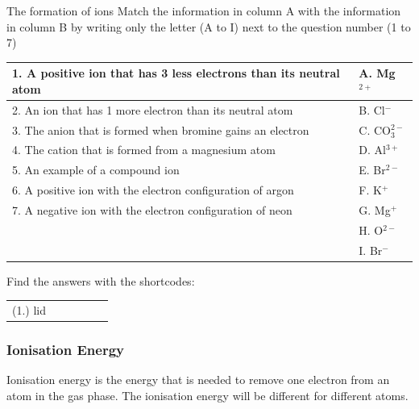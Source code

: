 \begin{exercises}{The formation of ions}
            \nopagebreak
            \label{m38757*id261135}Match the information in column A with the information in column B by writing only the letter (A to I) next to the question number (1 to 7)
\begin{center}
\begin{tabular}{|p{6cm}|p{2cm}|}\hline
1. A positive ion that has 3 less electrons than its neutral atom & A. Mg$^{2+}$ \\\hline
2. An ion that has 1 more electron than its neutral atom & B. Cl$^{-}$ \\\hline
3. The anion that is formed when bromine gains an electron & C. CO$_{3}^{2-}$ \\\hline
4. The cation that is formed from a magnesium atom & D. Al$^{3+}$ \\\hline
5. An example of a compound ion & E. Br$^{2-}$ \\\hline
6. A positive ion with the electron configuration of argon & F. K$^{+}$ \\\hline
7. A negative ion with the electron configuration of neon & G. Mg$^{+}$ \\\hline
 & H. O$^{2-}$ \\\hline
 & I. Br$^{-}$ \\\hline
\end{tabular}
\end{center}
      
\label{m38757*uid132}
\par {} Find the answers with the shortcodes:
 \par \begin{tabular}[h]{cccccc}
 (1.) lid  & \end{tabular}

\end{exercises}

            \subsubsection*{Ionisation Energy}
            \nopagebreak
            \label{m38757*id261078}Ionisation energy is the energy that is needed to remove one electron from an atom in the gas phase. The ionisation energy will be different for different atoms.\par 
        \label{m38757*eip-622}

